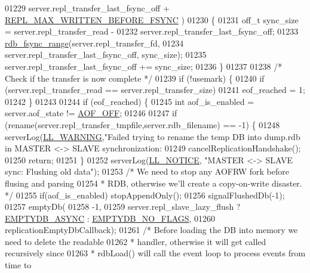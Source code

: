 \begin{DoxyCode}
{{{{{{{{{{{{{{{{{{{{{{{{{{{{{{{{{{{{{{{{{{{{{{{01229         server.repl\_transfer\_last\_fsync\_off + \hyperlink{replication_8c_a9a25193630fb39ddc25ea99935beca00}{REPL\_MAX\_WRITTEN\_BEFORE\_FSYNC}
      )
01230     \{
01231         off\_t sync\_size = server.repl\_transfer\_read -
01232                           server.repl\_transfer\_last\_fsync\_off;
01233         \hyperlink{config_8h_a05dc8943201853339c308c0762f023c1}{rdb\_fsync\_range}(server.repl\_transfer\_fd,
01234             server.repl\_transfer\_last\_fsync\_off, sync\_size);
01235         server.repl\_transfer\_last\_fsync\_off += sync\_size;
01236     \}
01237 
01238     \textcolor{comment}{/* Check if the transfer is now complete */}
01239     \textcolor{keywordflow}{if} (!usemark) \{
01240         \textcolor{keywordflow}{if} (server.repl\_transfer\_read == server.repl\_transfer\_size)
01241             eof\_reached = 1;
01242     \}
01243 
01244     \textcolor{keywordflow}{if} (eof\_reached) \{
01245         \textcolor{keywordtype}{int} aof\_is\_enabled = server.aof\_state != \hyperlink{server_8h_a5226306fbcebcb6d5d02e0fef3c213c2}{AOF\_OFF};
01246 
01247         \textcolor{keywordflow}{if} (rename(server.repl\_transfer\_tmpfile,server.rdb\_filename) == -1) \{
01248             serverLog(\hyperlink{server_8h_a31229b9334bba7d6be2a72970967a14b}{LL\_WARNING},\textcolor{stringliteral}{"Failed trying to rename the temp DB into dump.rdb in
       MASTER <-> SLAVE synchronization: %
01249             cancelReplicationHandshake();
01250             \textcolor{keywordflow}{return};
01251         \}
01252         serverLog(\hyperlink{server_8h_a8c54c191e436c7dd3012167212692401}{LL\_NOTICE}, \textcolor{stringliteral}{"MASTER <-> SLAVE sync: Flushing old data"});
01253         \textcolor{comment}{/* We need to stop any AOFRW fork before flusing and parsing}
01254 \textcolor{comment}{         * RDB, otherwise we'll create a copy-on-write disaster. */}
01255         \textcolor{keywordflow}{if}(aof\_is\_enabled) stopAppendOnly();
01256         signalFlushedDb(-1);
01257         emptyDb(
01258             -1,
01259             server.repl\_slave\_lazy\_flush ? \hyperlink{server_8h_a83bdc5c1a2af487191bb7ca716494ee7}{EMPTYDB\_ASYNC} : 
      \hyperlink{server_8h_a83a0ecde3a9f1f6bbcae9f4b966a509b}{EMPTYDB\_NO\_FLAGS},
01260             replicationEmptyDbCallback);
01261         \textcolor{comment}{/* Before loading the DB into memory we need to delete the readable}
01262 \textcolor{comment}{         * handler, otherwise it will get called recursively since}
01263 \textcolor{comment}{         * rdbLoad() will call the event loop to process events from time to}
}}}}}}}}}}}}}}}}}}}}}}}}}}}}}}}}}}}}}}}}}}}}}}}}
\end{DoxyCode}
